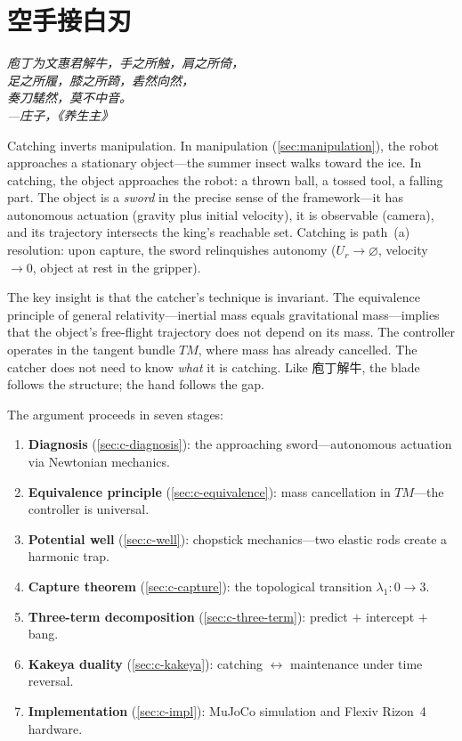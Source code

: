 \chapter{空手接白刃}\label{sec:catching}

\begin{center}
\itshape
庖丁为文惠君解牛，手之所触，肩之所倚，\\
足之所履，膝之所踦，砉然向然，\\
奏刀騞然，莫不中音。\\[4pt]
\upshape ---庄子，《养生主》
\end{center}

\bigskip

Catching inverts manipulation.  In manipulation
(\cref{sec:manipulation}), the robot approaches a stationary
object---the summer insect walks toward the ice.  In catching, the
object approaches the robot: a thrown ball, a tossed tool, a falling
part.  The object is a \emph{sword} in the precise sense of the
framework---it has autonomous actuation (gravity plus initial
velocity), it is observable (camera), and its trajectory intersects
the king's reachable set.  Catching is path~(a) resolution: upon
capture, the sword relinquishes autonomy ($U_r \to \varnothing$,
velocity $\to 0$, object at rest in the gripper).

The key insight is that the catcher's technique is invariant.
The equivalence principle of general relativity---inertial mass
equals gravitational mass---implies that the object's free-flight
trajectory does not depend on its mass.  The controller operates in
the tangent bundle $TM$, where mass has already cancelled.  The
catcher does not need to know \emph{what} it is catching.  Like
庖丁解牛, the blade follows the structure; the hand follows the
gap.

The argument proceeds in seven stages:
\begin{enumerate}
  \item \textbf{Diagnosis} (\cref{sec:c-diagnosis}): the approaching
  sword---autonomous actuation via Newtonian mechanics.
  \item \textbf{Equivalence principle} (\cref{sec:c-equivalence}):
  mass cancellation in $TM$---the controller is universal.
  \item \textbf{Potential well} (\cref{sec:c-well}): chopstick
  mechanics---two elastic rods create a harmonic trap.
  \item \textbf{Capture theorem} (\cref{sec:c-capture}): the
  topological transition $\lambda_1\colon 0 \to 3$.
  \item \textbf{Three-term decomposition} (\cref{sec:c-three-term}):
  predict $+$ intercept $+$ bang.
  \item \textbf{Kakeya duality} (\cref{sec:c-kakeya}): catching
  $\leftrightarrow$ maintenance under time reversal.
  \item \textbf{Implementation} (\cref{sec:c-impl}): MuJoCo
  simulation and Flexiv Rizon~4 hardware.
\end{enumerate}


